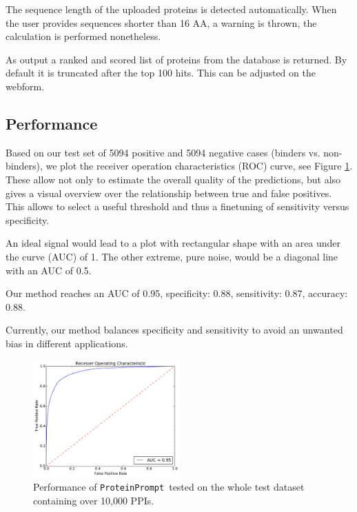 \documentclass[3p,times,twocolumn]{elsarticle}
\newcommand{\TODO}[1] {\begingroup\color{red}#1\endgroup}
\newcommand{\tool}{\texttt{ProteinPrompt}}
\begin{document}
The sequence length of the uploaded proteins is detected automatically. When the user provides
sequences shorter than 16 AA, a warning is thrown,
the calculation is performed nonetheless.

As output a ranked and scored list of proteins from the database is
returned. By default it is truncated after the top 100 
hits. This can be adjusted on the webform. 


\subsection{Performance}
\label{performance}

Based on our test set of 5094 positive and 5094 negative cases
(binders vs. non-binders), we plot the receiver operation
characteristics (ROC) curve, see Figure \ref{fig:roc}.
These allow not only to estimate the overall quality of the predictions, but also
gives a visual overview over the relationship between true and false
positives. This allows to select a useful threshold and thus a
finetuning of sensitivity versus specificity.

An ideal signal would lead to a plot with rectangular shape
with an area under the curve (AUC) of 1. The other extreme, pure noise, would be a diagonal
line with an AUC of 0.5.

Our method reaches an AUC of 0.95,
specificity: 0.88,
sensitivity: 0.87,
accuracy: 0.88.

Currently, our method balances specificity and sensitivity to avoid an
unwanted bias in different applications.

\begin{figure}[t]
\includegraphics[width=0.5\textwidth]{img/meta_final_roc.pdf}
\caption{Performance of \tool\  tested on the whole test dataset
  containing over 10,000 PPIs.}
\label{fig:roc}
\end{figure} 
\end{document}

